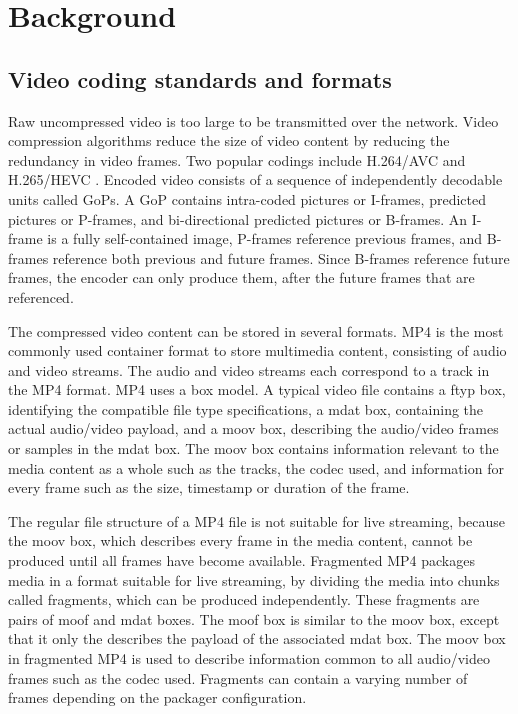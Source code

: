 
\chapter{Background}\label{chapter:background}

\section{Video coding standards and formats}
Raw uncompressed video is too large to be transmitted over the network. Video compression algorithms reduce the size of video content by reducing the redundancy in video frames. Two popular codings include H.264/AVC \parencite{wiegandOverview264AVC2003} and H.265/HEVC \parencite{sullivanOverviewHighEfficiency2012}. Encoded video consists of a sequence of independently decodable units called \acp{GoP}. A \ac{GoP} contains intra-coded pictures or I-frames, predicted pictures or P-frames, and bi-directional predicted pictures or B-frames. An I-frame is a fully self-contained image, P-frames reference previous frames, and B-frames reference both previous and future frames. Since B-frames reference future frames, the encoder can only produce them, after the future frames that are referenced.


The compressed video content can be stored in several formats. MP4 is the most commonly used container format to store multimedia content, consisting of audio and video streams. The audio and video streams each correspond to a track in the MP4 format. MP4 uses a box model. A typical video file contains a ftyp box, identifying the compatible file type specifications, a mdat box, containing the actual audio/video payload, and a moov box, describing the audio/video frames or samples in the mdat box. The moov box contains information relevant to the media content as a whole such as the tracks, the codec used, and information for every frame such as the size, timestamp or duration of the frame.

The regular file structure of a MP4 file is not suitable for live streaming, because the moov box, which describes every frame in the media content, cannot be produced until all frames have become available. Fragmented MP4 packages media in a format suitable for live streaming, by dividing the media into chunks called fragments, which can be produced independently. These fragments are pairs of moof and mdat boxes. The moof box is similar to the moov box, except that it only the describes the payload of the associated mdat box. The moov box in fragmented MP4 is used to describe information common to all audio/video frames such as the codec used. Fragments can contain a varying number of frames depending on the packager configuration.

